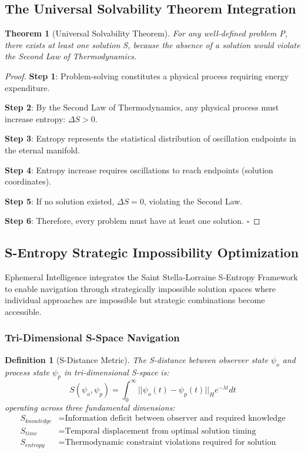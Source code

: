 \documentclass[12pt,a4paper]{article}
\newtheorem{theorem}{Theorem}
\newtheorem{definition}{Definition}
\begin{document}
\subsection{The Universal Solvability Theorem Integration}

\begin{theorem}[Universal Solvability Theorem]
For any well-defined problem P, there exists at least one solution S, because the absence of a solution would violate the Second Law of Thermodynamics.
\end{theorem}

\begin{proof}
\textbf{Step 1}: Problem-solving constitutes a physical process requiring energy expenditure.

\textbf{Step 2}: By the Second Law of Thermodynamics, any physical process must increase entropy: $\Delta S > 0$.

\textbf{Step 3}: Entropy represents the statistical distribution of oscillation endpoints in the eternal manifold.

\textbf{Step 4}: Entropy increase requires oscillations to reach endpoints (solution coordinates).

\textbf{Step 5}: If no solution existed, $\Delta S = 0$, violating the Second Law.

\textbf{Step 6}: Therefore, every problem must have at least one solution. $\square$
\end{proof}

\subsection{S-Entropy Strategic Impossibility Optimization}

Ephemeral Intelligence integrates the Saint Stella-Lorraine S-Entropy Framework to enable navigation through strategically impossible solution spaces where individual approaches are impossible but strategic combinations become accessible.

\subsubsection{Tri-Dimensional S-Space Navigation}

\begin{definition}[S-Distance Metric]
The S-distance between observer state $\psi_o$ and process state $\psi_p$ in tri-dimensional S-space is:
\begin{equation}
S(\psi_o, \psi_p) = \int_0^\infty ||\psi_o(t) - \psi_p(t)||_H e^{-\lambda t} dt
\end{equation}
operating across three fundamental dimensions:
\begin{align}
S_{knowledge} &= \text{Information deficit between observer and required knowledge} \\
S_{time} &= \text{Temporal displacement from optimal solution timing} \\
S_{entropy} &= \text{Thermodynamic constraint violations required for solution}
\end{align}
\end{definition}
\end{document}
